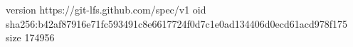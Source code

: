 version https://git-lfs.github.com/spec/v1
oid sha256:b42af87916e71fc593491c8e6617724f0d7c1e0ad134406d0ecd61acd978f175
size 174956
